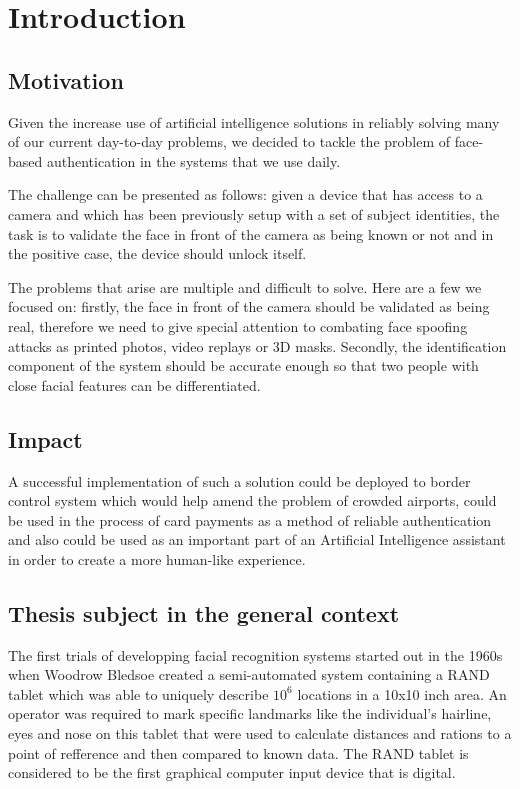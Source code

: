 \chapter{Introduction}

\section{Motivation}

Given the increase use of artificial intelligence solutions in reliably solving many of our current day-to-day problems, we decided to tackle the problem of face-based authentication in the systems that we use daily.

The challenge can be presented as follows: given a device that has access to a camera and which has been previously setup with a set of subject identities, the task is to validate the face in front of the camera as being known or not and in the positive case, the device should unlock itself.

The problems that arise are multiple and difficult to solve. Here are a few we focused on: firstly, the face in front of the camera should be validated as being real, therefore we need to give special attention to combating face spoofing attacks as printed photos, video replays or 3D masks. Secondly, the identification component of the system should be accurate enough so that two people with close facial features can be differentiated.

\section{Impact}
A successful implementation of such a solution could be deployed to border control system which would help amend the problem of crowded airports, could be used in the process of card payments as a method of reliable authentication and also could be used as an important part of an Artificial Intelligence assistant in order to create a more human-like experience.

\section{Thesis subject in the general context}
The first trials of developping facial recognition systems started out in the 1960s when Woodrow Bledsoe created a semi-automated system \cite{DavisMRETO64} containing a RAND tablet which was able to uniquely describe $10^{6}$ locations in a 10x10 inch area.
An operator was required to mark specific landmarks like the individual's  hairline, eyes and nose on this tablet that were used to calculate distances and rations to a point of refference and then compared to known data. The RAND tablet is considered to be the first graphical computer input device that is digital.

